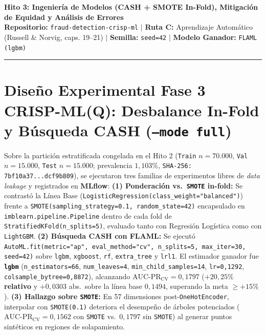 \documentclass[9pt,letterpaper]{article}
\begin{document}
\begin{center}
    {\large \textbf{Hito 3: Ingeniería de Modelos (CASH + SMOTE In-Fold), Mitigación de Equidad y Análisis de Errores}}\\[1.5pt]
    {\scriptsize \textbf{Repositorio:} \texttt{fraud-detection-crisp-ml} $|$ \textbf{Ruta C:} Aprendizaje Automático (Russell \& Norvig, caps. 19--21) $|$ \textbf{Semilla:} \texttt{seed=42} $|$ \textbf{Modelo Ganador:} \texttt{FLAML (lgbm)}}
\end{center}
\vspace{-5pt}
\hrule
\vspace{2.2pt}

\section{Diseño Experimental Fase 3 CRISP-ML(Q): Desbalance In-Fold y Búsqueda CASH (\texttt{--mode full})}
Sobre la partición estratificada congelada en el Hito 2 (\texttt{Train} $n=70.000$, \texttt{Val} $n=15.000$, \texttt{Test} $n=15.000$; prevalencia $1,103\%$, \texttt{SHA-256: 7bf10a37...dcf9b809}), se ejecutaron tres familias de experimentos libres de \textit{data leakage} y registrados en \textbf{MLflow}: \textbf{(1) Ponderación vs.\ \texttt{SMOTE} in-fold:} Se contrastó la Línea Base (\texttt{LogisticRegression(class\_weight="balanced")}) frente a \texttt{SMOTE(sampling\_strategy=0.1, random\_state=42)} encapsulado en \texttt{imblearn.pipeline.Pipeline} dentro de cada fold de \texttt{StratifiedKFold(n\_splits=5)}, evaluado tanto con Regresión Logística como con \texttt{LightGBM}. \textbf{(2) Búsqueda CASH con FLAML:} Se ejecutó \texttt{AutoML.fit(metric="ap", eval\_method="cv", n\_splits=5, max\_iter=30, seed=42)} sobre \texttt{lgbm}, \texttt{xgboost}, \texttt{rf}, \texttt{extra\_tree} y \texttt{lrl1}. El estimador ganador fue \textbf{\texttt{lgbm}} (\texttt{n\_estimators=66}, \texttt{num\_leaves=4}, \texttt{min\_child\_samples=14}, \texttt{lr=0,1292}, \texttt{colsample\_bytree=0,8872}), alcanzando \textbf{$\text{AUC-PR}_{\text{CV}} = 0,1797$} (\textbf{$+20,25\%$ relativo} y $+0,0303$ abs.\ sobre la línea base $0,1494$, superando la meta $\ge +15\%$). \textbf{(3) Hallazgo sobre \texttt{SMOTE}:} En 57 dimensiones post-\texttt{OneHotEncoder}, interpolar con \texttt{SMOTE(0.1)} deteriora el desempeño de árboles potenciados ($\text{AUC-PR}_{\text{CV}}=0,1562$ con \texttt{SMOTE} vs.\ $0,1797$ sin \texttt{SMOTE}) al generar puntos sintéticos en regiones de solapamiento.
\end{document}

